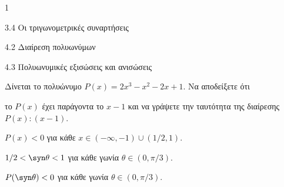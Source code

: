 \begin{ylh}{1}
\item 3.4 Οι τριγωνομετρικές συναρτήσεις
\item 4.2 Διαίρεση πολυωνύμων
\item 4.3 Πολυωνυμικές εξισώσεις και ανισώσεις
\end{ylh}
Δίνεται το πολυώνυμο $P(x) = 2x^3 - x^2 - 2x + 1$. Να αποδείξετε ότι
\begin{alist}
\item το $P(x)$ έχει παράγοντα το $x - 1$ και να γράψετε την ταυτότητα της διαίρεσης $P(x) : (x - 1)$.
\item $P(x) < 0$ για κάθε $x \in (-\infty, -1) \cup (1/2, 1)$.
\item $1/2 < \syn  \theta < 1$ για κάθε γωνία $\theta \in (0, \pi/3)$.
\item $P(\syn  \theta) < 0$ για κάθε γωνία $\theta \in (0, \pi/3)$.
\end{alist}

